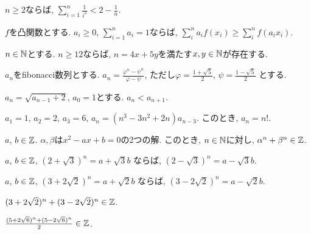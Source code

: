 \begin{prop}
  $n\geq 2$ならば,
  $\sum_{i=1}^{n}\frac{1}{i^2}<2-\frac{1}{n}$.
\end{prop}

\begin{prop}
  $f$を凸関数とする.
  $a_i\geq 0$, $\sum_{i=1}^n a_i=1$ならば,
  $\sum_{i}^{n} a_i f(x_i)\geq \sum_{i}^{n}  f(a_i x_i)$.
\end{prop}




\begin{prop}
$n\in\mathbb{N}$とする.
  $n\geq 12$ならば, $n=4x+5y$を満たす$x,y\in\mathbb{N}$が存在する.
\end{prop}


\begin{prop}
  $a_n$をfibonacci数列とする.
  $a_n=\frac{\varphi^n-\psi^n}{\varphi-\psi}$,
  ただし$\varphi=\frac{1+\sqrt{5}}{2}$,
  $\psi=\frac{1-\sqrt{5}}{2}$
  とする.
\end{prop}

\begin{prop}
  $a_n=\sqrt{a_{n-1}+2}$, $a_0=1$とする.
  $a_n<a_{n+1}$.
\end{prop}



\begin{prop}
  $a_1=1$, $a_2=2$, $a_3=6$,
  $a_n=(n^3-3n^2+2n)a_{n-3}$.
  このとき, $a_n=n!$.
\end{prop}



\begin{prop}
  $a$, $b\in\mathbb{Z}$.
  $\alpha, \beta$は$x^2-ax+b=0$の2つの解.
  このとき, $n\in\mathbb{N}$に対し,
  $\alpha^n+\beta^n\in \mathbb{Z}$.
\end{prop}

\begin{prop}
  $a$, $b\in\mathbb{Z}$,  
  $(2+\sqrt{3})^n=a+\sqrt{3}b$
  ならば,
  $(2-\sqrt{3})^n=a-\sqrt{3}b$.
\end{prop}

\begin{prop}
  $a$, $b\in\mathbb{Z}$,  
  $(3+2\sqrt{2})^n=a+\sqrt{2}b$
  ならば,
  $(3-2\sqrt{2})^n=a-\sqrt{2}b$.
\end{prop}


\begin{prop}
  $(3+2\sqrt{2})^n+(3-2\sqrt{2})^n\in\mathbb{Z}$.
\end{prop}

\begin{prop}
  $\frac{(5+2\sqrt{6})^n+(5-2\sqrt{6})^n}{2}\in\mathbb{Z}$.
\end{prop}

